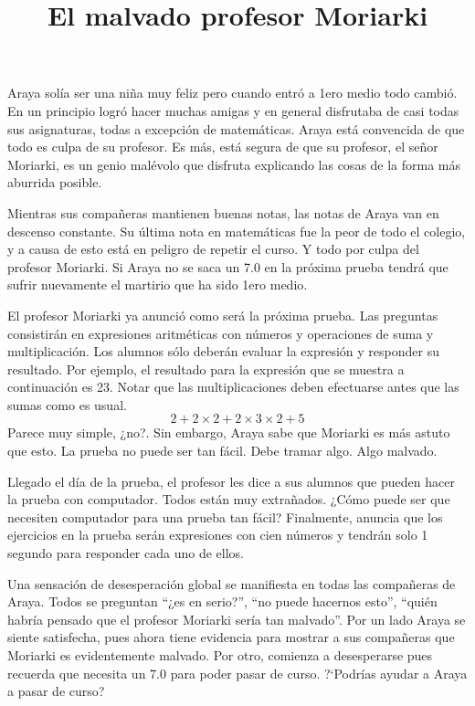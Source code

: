 \documentclass{oci}
\title{El malvado profesor Moriarki}
\begin{document}
\begin{problemDescription}
Araya solía ser una niña muy feliz pero cuando entró a 1ero medio todo cambió.
En un principio logró hacer muchas amigas y en general disfrutaba de casi todas
sus asignaturas, todas a excepción de matemáticas.
Araya está convencida de que todo es culpa de su profesor.
Es más, está segura de que su profesor, el señor Moriarki, es un genio malévolo
que disfruta explicando las cosas de la forma más aburrida posible.

Mientras sus compañeras mantienen buenas notas, las notas de Araya van en
descenso constante.
Su última nota en matemáticas fue la peor de todo el colegio, y a causa de esto
está en peligro de repetir el curso.
Y todo por culpa del profesor Moriarki.
Si Araya no se saca un 7.0 en la próxima prueba tendrá que sufrir nuevamente el
martirio que ha sido 1ero medio.

El profesor Moriarki ya anunció como será la próxima prueba.
Las preguntas consistirán en expresiones aritméticas con números y operaciones
de suma y multiplicación.
Los alumnos sólo deberán evaluar la expresión y responder su resultado.
Por ejemplo, el resultado para la expresión que se muestra a continuación es 23.
Notar que las multiplicaciones deben efectuarse antes que las sumas como es usual.
$$
2 + 2 \times 2 + 2\times 3 \times 2 + 5
$$
Parece muy simple, ¿no?.
Sin embargo, Araya sabe que Moriarki es más astuto que 	esto.
La prueba no puede ser tan fácil.
Debe tramar algo.
Algo malvado.

Llegado el día de la prueba, el profesor les dice a sus alumnos que pueden hacer
la prueba con computador.
Todos están muy extrañados.
¿Cómo puede ser que necesiten computador para una prueba tan fácil?
Finalmente, anuncia que los ejercicios en la prueba serán expresiones con cien
números y tendrán solo 1 segundo para responder cada uno de ellos.

Una sensación de desesperación global se manifiesta en todas las compañeras de
Araya.
Todos se preguntan ``¿es en serio?'', ``no puede hacernos esto'', ``quién
habría pensado que el profesor Moriarki sería tan malvado''.
Por un lado Araya se siente satisfecha, pues ahora tiene evidencia para mostrar a sus
compañeras que Moriarki es evidentemente malvado.
Por otro, comienza a desesperarse pues recuerda que necesita un 7.0 para poder
pasar de curso.
?`Podrías ayudar a Araya a pasar de curso?


\end{problemDescription}
\end{document}
